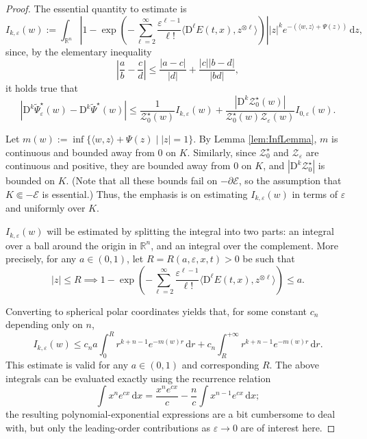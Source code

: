 \documentclass[reqno]{amsart}
\theoremstyle{definition}
\begin{document}
\begin{proof}
	The essential quantity to estimate is
	\[
		I_{k, {\varepsilon}} (w) := \int_{{\mathbb{R}}^{n}} \left| 1 - \exp \left( - \sum_{\ell = 2}^{\infty} \frac{{\varepsilon}^{\ell - 1}}{\ell !} \big\langle {\mathrm{D}}^{\ell} E(t, x), z^{\otimes \ell} \big\rangle \right) \right| | z |^{k} e^{- (\langle w, z \rangle + \Psi(z))} \, {\mathrm{d}} z,
	\]
	since, by the elementary inequality
	\[
		\left| \frac{a}{b} - \frac{c}{d} \right| \leq \frac{| a - c |}{| d |} + \frac{| c | | b - d |}{| b d |},
	\]
	it holds true that
	\begin{equation}
		\label{eq:DkFepsErrorBound}
		| {\mathrm{D}}^{k} {\widetilde{\Psi}}_{\varepsilon}^{\star} (w) - {\mathrm{D}}^{k} {\widetilde{\Psi}}^{\star} (w) | \leq \frac{1}{\mathcal{Z}_{0}^{\star} (w)} I_{k, {\varepsilon}} (w) + \frac{| {\mathrm{D}}^{k} \mathcal{Z}_{0}^{\star} (w) |}{\mathcal{Z}_{0}^{\star} (w) \mathcal{Z}_{\varepsilon} (w)} I_{0, {\varepsilon}} (w).
	\end{equation}

	Let $m(w) := \inf \{ \langle w, z \rangle + \Psi(z) \mid | z | = 1 \}$.  By Lemma \ref{lem:InfLemma}, $m$ is continuous and bounded away from $0$ on $K$.  Similarly, since $\mathcal{Z}_{0}^{\star}$ and $\mathcal{Z}_{\varepsilon}$ are continuous and positive, they are bounded away from $0$ on $K$, and $| {\mathrm{D}}^{k} \mathcal{Z}_{0}^{\star} |$ is bounded on $K$.  (Note that all these bounds fail on $- \partial {\mathcal{E}}$, so the assumption that $K \Subset - {\mathcal{E}}$ is essential.)  Thus, the emphasis is on estimating $I_{k, {\varepsilon}} (w)$ in terms of ${\varepsilon}$ and uniformly over $K$.  

	$I_{k, {\varepsilon}} (w)$ will be estimated by splitting the integral into two parts:  an integral over a ball around the origin in ${\mathbb{R}}^{n}$, and an integral over the complement.  More precisely, for any $a \in (0, 1)$, let $R = R(a, {\varepsilon}, x, t) > 0$ be such that
	\begin{equation}
		\label{eq:aandRBound}
		| z | \leq R \implies 1 - \exp \left( - \sum_{\ell = 2}^{\infty} \frac{{\varepsilon}^{\ell - 1}}{\ell !} \langle {\mathrm{D}}^{\ell} E(t, x), z^{\otimes \ell} \rangle \right) \leq a.
	\end{equation}

	\noindent Converting to spherical polar coordinates yields that, for some constant $c_{n}$ depending only on $n$,
	\[
		I_{k, {\varepsilon}} (w) \leq c_{n} a \int_{0}^{R} r^{k + n - 1} e^{- m(w) r} \, {\mathrm{d}} r + c_{n} \int_{R}^{+ \infty} r^{k + n - 1} e^{- m(w) r} \, {\mathrm{d}} r.
	\]
	This estimate is valid for any $a \in (0, 1)$ and corresponding $R$.  The above integrals can be evaluated exactly using the recurrence relation
	\[
		\int x^{n} e^{c x} \, {\mathrm{d}} x = \frac{x^{n} e^{c x}}{c} - \frac{n}{c} \int x^{n - 1} e^{c x} \, {\mathrm{d}} x;
	\]
	the resulting polynomial-exponential expressions are a bit cumbersome to deal with, but only the leading-order contributions as ${\varepsilon} \to 0$ are of interest here.  


\end{proof}
\end{document}
